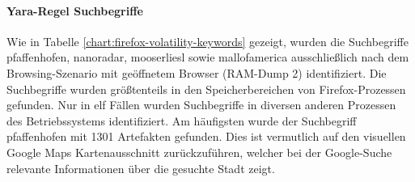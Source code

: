 \paragraph*{Yara-Regel \glqq{}Suchbegriffe\grqq{}}
Wie in Tabelle \ref{chart:firefox-volatility-keywords} gezeigt, wurden die Suchbegriffe \glqq{}pfaffenhofen\grqq{}, \glqq{}nanoradar\grqq{}, \glqq{}mooserliesl\grqq{} sowie \glqq{}mallofamerica\grqq{} ausschließlich nach dem Browsing-Szenario mit geöffnetem Browser (RAM-Dump 2) identifiziert. Die Suchbegriffe wurden größtenteils in den Speicherbereichen von Firefox-Prozessen gefunden. Nur in elf Fällen wurden Suchbegriffe in diversen anderen Prozessen des Betriebssystems identifiziert. Am häufigsten wurde der Suchbegriff \glqq{}pfaffenhofen\grqq{} mit 1301 Artefakten gefunden. Dies ist vermutlich auf den  visuellen Google Maps Kartenausschnitt zurückzuführen, welcher bei der Google-Suche relevante Informationen über die gesuchte Stadt zeigt. 

